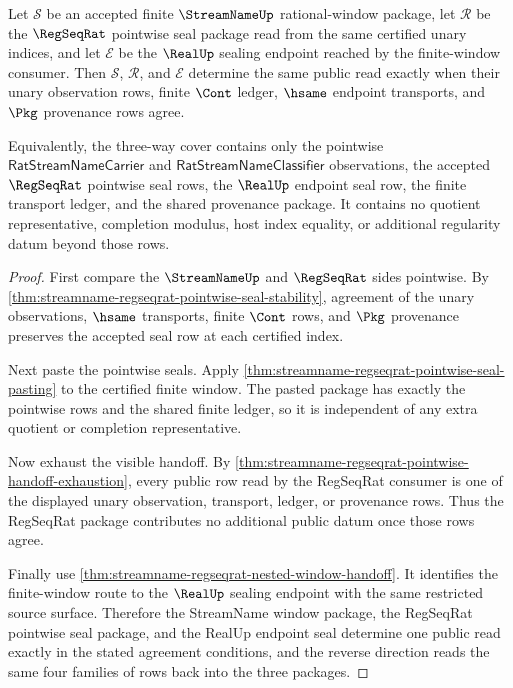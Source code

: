 \begin{theorem}
\label{thm:streamname-regseqrat-realup-triple-seal-cover}
Let $\mathcal{S}$ be an accepted finite $\StreamNameUp$ rational-window
package, let $\mathcal{R}$ be the $\RegSeqRat$ pointwise seal package read from
the same certified unary indices, and let $\mathcal{E}$ be the $\RealUp$
sealing endpoint reached by the finite-window consumer. Then $\mathcal{S}$,
$\mathcal{R}$, and $\mathcal{E}$ determine the same public read exactly when
their unary observation rows, finite $\Cont$ ledger, $\hsame$ endpoint
transports, and $\Pkg$ provenance rows agree.

Equivalently, the three-way cover contains only the pointwise
$\mathsf{RatStreamNameCarrier}$ and
$\mathsf{RatStreamNameClassifier}$ observations, the accepted
$\RegSeqRat$ pointwise seal rows, the $\RealUp$ endpoint seal row, the finite
transport ledger, and the shared provenance package. It contains no quotient
representative, completion modulus, host index equality, or additional
regularity datum beyond those rows.
\end{theorem}
\begin{proof}
First compare the $\StreamNameUp$ and $\RegSeqRat$ sides pointwise. By
\autoref{thm:streamname-regseqrat-pointwise-seal-stability}, agreement of the
unary observations, $\hsame$ transports, finite $\Cont$ rows, and $\Pkg$
provenance preserves the accepted seal row at each certified index.

Next paste the pointwise seals. Apply
\autoref{thm:streamname-regseqrat-pointwise-seal-pasting} to the certified
finite window. The pasted package has exactly the pointwise rows and the shared
finite ledger, so it is independent of any extra quotient or completion
representative.

Now exhaust the visible handoff. By
\autoref{thm:streamname-regseqrat-pointwise-handoff-exhaustion}, every public
row read by the RegSeqRat consumer is one of the displayed unary observation,
transport, ledger, or provenance rows. Thus the RegSeqRat package contributes
no additional public datum once those rows agree.

Finally use \autoref{thm:streamname-regseqrat-nested-window-handoff}. It
identifies the finite-window route to the $\RealUp$ sealing endpoint with the
same restricted source surface. Therefore the StreamName window package, the
RegSeqRat pointwise seal package, and the RealUp endpoint seal determine one
public read exactly in the stated agreement conditions, and the reverse
direction reads the same four families of rows back into the three packages.
\end{proof}

